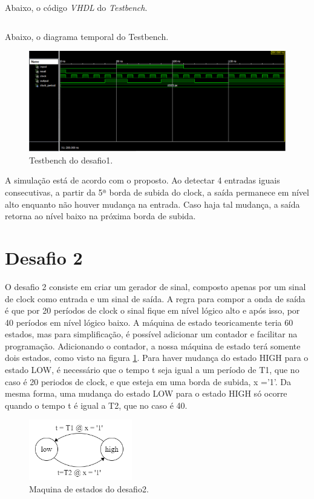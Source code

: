 \documentclass[12pt]{article}
\begin{document}
Abaixo, o código \emph{VHDL} do \emph{Testbench}.

\inputminted{vhdl}{sequencer_detector_tb.vhd}



Abaixo, o diagrama temporal do Testbench.

\begin{figure}[!h]
    \centering
    \includegraphics[width=1.0\textwidth]{lab8_sequence_detector_tb.png}
    \caption{Testbench do desafio1.}
\end{figure}

A simulação está de acordo com o proposto. Ao detectar 4 entradas iguais consecutivas, a partir da 5ª borda de subida do clock, a saída permanece em nível alto enquanto não houver mudança na entrada. Caso haja tal mudança, a saída retorna ao nível baixo na próxima borda de subida.


\clearpage
\section{Desafio 2}
O desafio 2 consiste em criar um gerador de sinal, composto apenas por um sinal de clock como entrada e um sinal de saída. A regra para compor a onda de saída é que por 20 períodos de clock o sinal fique em nível lógico alto e após isso, por 40 períodos em nível lógico baixo. A máquina de estado teoricamente teria 60 estados, mas para simplificação, é possível adicionar um contador e facilitar na programação. Adicionando o contador, a nossa máquina de estado terá somente dois estados, como visto na figura \ref{fsm2}. Para haver mudança do estado HIGH para o estado LOW, é necessário que o tempo t seja igual a um período de T1, que no caso é 20 periodos de clock, e que esteja em uma borda de subida, x ='1'. Da mesma forma, uma mudança do estado LOW para o estado HIGH só ocorre quando o tempo t é igual a T2, que no caso é 40.

\begin{figure}[!h]
    \centering
    \includegraphics[width=0.4\textwidth]{fsm2.PNG}
    \caption{Maquina de estados do desafio2.}
    \label{fsm2}
\end{figure}
\end{document}
